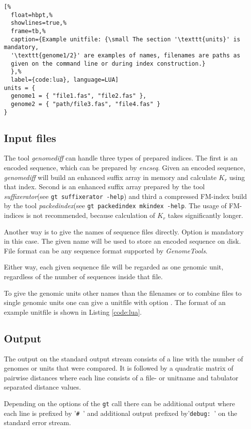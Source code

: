 \documentclass[12pt,titlepage]{article}
\newcommand{\Gdiff}{\textit{genomediff}\xspace}
\newcommand{\Suff}{\textit{suffixerator}\xspace}
\newcommand{\Mki}{\textit{packedindex}\xspace}
\newcommand{\Encseq}{\textit{encseq}\xspace}
\newcommand{\GenomeTools}{\textit{GenomeTools}\xspace}
\newcommand{\Gt}{\texttt{gt}\xspace}
\newcommand{\Kr}{\ensuremath{K_r}\xspace}
\begin{document}
\begin{lstlisting}[%
  float=hbpt,%
  showlines=true,%
  frame=tb,%
  caption={Example unitfile: {\small The section '\texttt{units}' is mandatory,
  '\texttt{genome1/2}' are examples of names, filenames are paths as
  given on the command line or during index construction.}
  },%
  label={code:lua}, language=LUA]
units = {
  genome1 = { "file1.fas", "file2.fas" },
  genome2 = { "path/file3.fas", "file4.fas" }
}
\end{lstlisting}

\subsection{Input files}
The tool \Gdiff can handle three types of prepared indices. The first is an
encoded sequence, which can be prepared by \Encseq. Given an encoded sequence,
\Gdiff will build an enhanced suffix array in memory and calculate \Kr using
that index. Second is an enhanced suffix array prepared by the tool \Suff (see
\texttt{gt suffixerator -help}) and third a compressed FM-index build by the
tool \Mki (see \texttt{gt packedindex mkindex -help}. The usage of FM-indices is
not recommended, because calculation of \Kr takes significantly longer.

Another way is to give the names of sequence files directly. Option
 is mandatory in this case. The given name will be used
to store an encoded sequence on disk. File format can be any sequence format
supported by \GenomeTools.

Either way, each given sequence file will be regarded as one genomic unit,
regardless of the number of sequences inside that file.

To give the genomic units other names than the filenames or to combine files to
single genomic units one can give a unitfile with option .
The format of an example unitfile is shown in Listing \ref{code:lua}.

\subsection{Output}
The output on the standard output stream consists of a line with the number of
genomes or units that were compared. It is followed by a quadratic matrix of
pairwise distances where each line consists of a file- or unitname and tabulator
separated distance values.

Depending on the options of the \Gt call there can be additional output where
each line is prefixed by '\texttt{\# }' and additional output prefixed
by'\texttt{debug: }' on the standard error stream.
\end{document}

